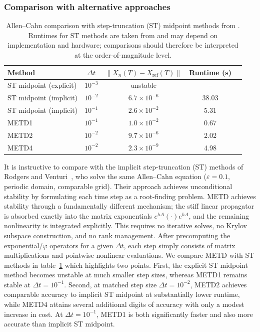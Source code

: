 \documentclass[12pt]{article}
\begin{document}
\subsubsection{Comparison with alternative approaches}
\label{sec:comparison_alternatives}
\begin{table}[t]
\centering
\caption{Allen--Cahn comparison with step-truncation (ST) midpoint methods from \cite{rodgers2023implicit}. Runtimes for ST methods are taken from \cite{rodgers2023implicit} and may depend on implementation and hardware; comparisons should therefore be interpreted at the order-of-magnitude level.
}
\label{tab:allen_cahn_comparison}
\begin{tabular}{lcccc}
\hline
Method  & $\Delta t$ & $\|X_n(T)-X_{\mathrm{ref}}(T)\|$ & Runtime (s) \\
\hline
ST midpoint (explicit) \cite{rodgers2023implicit} & $10^{-3}$ & unstable & -- \\

ST midpoint (implicit) \cite{rodgers2023implicit} & $10^{-2}$ & $6.7\times 10^{-6}$ & 38.03 \\

ST midpoint (implicit) \cite{rodgers2023implicit} & $10^{-1}$ & $2.6\times 10^{-2}$ & 5.31 \\

METD1 & $10^{-1}$ & $1.0\times 10^{-2}$ & 0.67 \\

METD2 & $10^{-2}$ & $9.7\times 10^{-6}$ & 2.02 \\

METD4 & $10^{-2}$ & $2.3\times 10^{-9}$ & 4.98 \\
\hline
\end{tabular}
\end{table}
It is instructive to compare with the implicit step-truncation (ST) methods of
Rodgers and Venturi~\cite{rodgers2023implicit}, who solve the same
Allen--Cahn equation ($\varepsilon=0.1$, periodic domain, comparable grid). Their approach achieves unconditional stability by formulating each time step as a root-finding problem. METD achieves stability through a fundamentally different mechanism; the
stiff linear propagator is absorbed exactly into the matrix exponentials
$e^{hA}(\cdot)e^{hA}$, and the remaining nonlinearity is integrated
explicitly. This requires no iterative solves, no Krylov subspace
construction, and no rank management. After precomputing the exponential/$\varphi$ operators for a given $\Delta t$, each step simply consists of matrix multiplications and pointwise nonlinear evaluations. 
We compare METD with ST methods in table~\ref{tab:allen_cahn_comparison} which highlights two points. First, the explicit ST midpoint method becomes unstable at much smaller step sizes, whereas METD1 remains stable at $\Delta t=10^{-1}$. Second, at matched step size $\Delta t=10^{-2}$, METD2 achieves comparable accuracy to implicit ST midpoint at substantially lower runtime, while METD4 attains several additional digits of accuracy with only a modest increase in cost. At $\Delta t=10^{-1}$, METD1 is both significantly faster and also more accurate than implicit ST midpoint.
\end{document}
